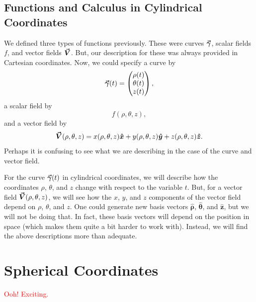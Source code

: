 \subsection{Functions and Calculus in Cylindrical Coordinates}

We defined three types of functions previously.  These were curves $\boldsymbol{\vec{\gamma}}$, scalar fields $f$, and vector fields $\boldsymbol{\vec{V}}$.  But, our description for these was always provided in Cartesian coordinates.  Now, we could specify a curve by
\[
\boldsymbol{\vec{\gamma}}(t) = \begin{pmatrix} \rho(t) \\ \theta(t) \\ z(t) \end{pmatrix},
\]
a scalar field by
\[
f(\rho,\theta,z),
\]
and a vector field by
\[
\boldsymbol{\vec{V}}(\rho,\theta,z) =  x(\rho,\theta,z)\boldsymbol{\hat{x}} + y(\rho,\theta,z)\boldsymbol{\hat{y}} + z(\rho,\theta,z)\boldsymbol{\hat{z}}.
\]
Perhaps it is confusing to see what we are describing in the case of the curve and vector field.  

For the curve $\boldsymbol{\vec{\gamma}}(t)$ in cylindrical coordinates, we will describe how the coordinates $\rho$, $\theta$, and $z$ change with respect to the variable $t$.  But, for a vector field $\boldsymbol{\vec{V}}(\rho,\theta,z)$, we will see how the $x$, $y$, and $z$ components of the vector field depend on $\rho$, $\theta$, and $z$.  One could generate new basis vectors $\boldsymbol{\hat{\rho}}$, $\boldsymbol{\hat{\theta}}$, and $\boldsymbol{\hat{z}}$, but we will not be doing that. In fact, these basis vectors will depend on the position in space (which makes them quite a bit harder to work with). Instead, we will find the above descriptions more than adequate.




\section{Spherical Coordinates}

\textcolor{red}{Ooh! Exciting.}
                